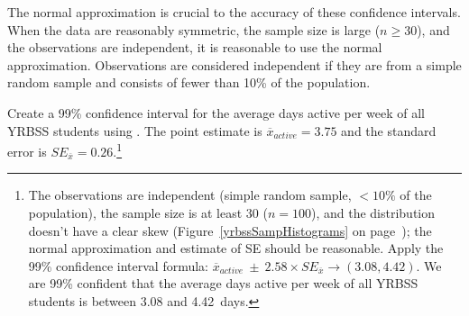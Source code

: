 \begin{spacing}{1.5}
The normal approximation is crucial to the accuracy of these confidence intervals. When the data are reasonably symmetric, the sample size is large ($n \geq 30$), and the observations are independent, it is reasonable to use the normal approximation. Observations are considered independent if they are from a simple random sample and consists of fewer than 10\% of the population. 


\begin{exercise} \label{find99CIForYrbssAgeExercise}
	Create a 99\% confidence interval for the average days active per week of all YRBSS students using . The point estimate is $\overline{x}_{active} = 3.75$ and the standard error is $SE_{\overline{x}} = 0.26$.\footnote{The observations are independent (simple random sample, $<10\%$ of the population), the sample size is at least 30 ($n = 100$), and the distribution doesn't have a clear skew (Figure~\ref{yrbssSampHistograms} on page~\pageref{yrbssSampHistograms}); the normal approximation and estimate of SE should be reasonable. Apply the 99\% confidence interval formula: $\overline{x}_{active}\ \pm\ 2.58 \times  SE_{\overline{x}} \rightarrow (3.08, 4.42)$. We are 99\% confident that the average days active per week of all YRBSS students is between 3.08 and 4.42~days.}
\end{exercise}

\end{spacing}
